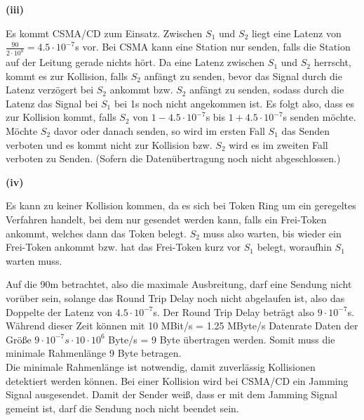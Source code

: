 \documentclass{../exercisesheet}
\begin{document}
\begin{exercise}{6}
\begin{subexercise}
\textbf{(iii)}
\begin{adjustwidth}{2em}{0em}\vspace{-\baselineskip}
	Es kommt CSMA/CD zum Einsatz. Zwischen $S_1$ und $S_2$ liegt eine Latenz von $\frac{90}{2 \cdot 10^8}= 4.5\cdot 10^{-7}$s vor. Bei CSMA kann eine Station nur senden, 
	falls die Station auf der Leitung gerade nichts hört. Da eine Latenz zwischen $S_1$ und $S_2$ herrscht, kommt es zur Kollision, falls $S_2$ anfängt zu senden, bevor
	das Signal durch die Latenz verzögert bei $S_2$ ankommt bzw. $S_2$ anfängt zu senden, sodass durch die Latenz das Signal bei $S_1$ bei 1s noch nicht angekommen ist.
	Es folgt also, dass es zur Kollision kommt, falls $S_2$ von $1-4.5\cdot 10^{-7}$s bis $1+4.5\cdot 10^{-7}$s senden möchte. Möchte $S_2$ davor oder danach senden, so
	wird im ersten Fall $S_1$ das Senden verboten und es kommt nicht zur Kollision bzw. $S_2$ wird es im zweiten Fall verboten zu Senden. (Sofern die Datenübertragung noch nicht abgeschlossen.)\\
\end{adjustwidth}
\textbf{(iv)}
\begin{adjustwidth}{2em}{0em}\vspace{-\baselineskip}
	Es kann zu keiner Kollision kommen, da es sich bei Token Ring um ein geregeltes Verfahren handelt, bei dem nur gesendet werden kann, falls ein Frei-Token ankommt, 
	welches dann das Token belegt. $S_2$ muss also warten, bis wieder ein Frei-Token ankommt bzw. hat das Frei-Token kurz vor $S_1$ belegt, woraufhin $S_1$ warten muss.
\end{adjustwidth}
\end{subexercise}
\begin{subexercise}
	Auf die 90m betrachtet, also die maximale Ausbreitung, darf eine Sendung nicht vorüber sein, solange das Round Trip Delay noch nicht abgelaufen ist, also das Doppelte
	der Latenz von $4.5\cdot 10^{-7}$s. Der Round Trip Delay beträgt also $9\cdot 10^{-7}$s. Während dieser Zeit können mit 10 MBit/s = 1.25 MByte/s Datenrate Daten der
	Größe $9\cdot 10^{-7}s \cdot 10 \cdot 10^6$ Byte/s = 9 Byte übertragen werden. Somit muss die minimale Rahmenlänge 9 Byte betragen.\\
	Die minimale Rahmenlänge ist notwendig, damit zuverlässig Kollisionen detektiert werden können. Bei einer Kollision wird bei CSMA/CD ein Jamming Signal ausgesendet. Damit
	der Sender weiß, dass er mit dem Jamming Signal gemeint ist, darf die Sendung noch nicht beendet sein.
\end{subexercise}

\end{exercise}
\end{document}

